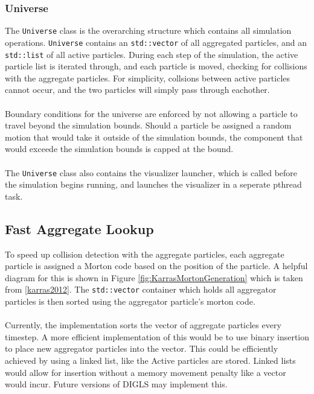 \documentclass[fleqn,10pt]{UserGuideArx} %
\begin{document}
\subsubsection{Universe}
The \texttt{Universe} class is the overarching structure which contains all simulation operations. \texttt{Universe} contains an \texttt{std\allowbreak::vector} of all aggregated particles, and an \texttt{std\allowbreak::list} of all active particles. During each step of the simulation, the active particle list is iterated through, and each particle is moved, checking for collisions with the aggregate particles. For simplicity, collsions between active particles cannot occur, and the two particles will simply pass through eachother. \\~\\
Boundary conditions for the universe are enforced by not allowing a particle to travel beyond the simulation bounds. Should a particle be assigned a random motion that would take it outside of the simulation bounds, the component that would exceede the simulation bounds is capped at the bound. \\~\\
The \texttt{Universe} class also contains the visualizer launcher, which is called before the simulation begins running, and launches the visualizer in a seperate pthread task.\\

\subsection{Fast Aggregate Lookup}
To speed up collision detection with the aggregate particles, each aggregate particle is assigned a Morton code based on the position of the particle. A helpful diagram for this is shown in Figure \ref{fig:KarrasMortonGeneration} which is taken from \ref{karras2012}. The \texttt{std\allowbreak::vector} container which holds all aggregator particles is then sorted using the aggregator particle's morton code. \\~\\
Currently, the implementation sorts the vector of aggregate particles every timestep. A more efficient implementation of this would be to use binary insertion to place new aggregator particles into the vector. This could be efficiently achieved by using a linked list, like the Active particles are stored. Linked lists would allow for insertion without a memory movement penalty like a vector would incur. Future versions of DIGLS may implement this.\\
\end{document}
